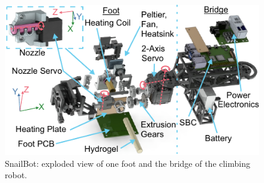 \begin{figure}
  \includegraphics[width=\linewidth]{chapters/papers/SB/figures/fig-7-snailbot-closeup-placeholder/fig-7-snailbot-closeup-placeholder.pdf}
  \caption{SnailBot: exploded view of one foot and the bridge of the climbing robot.}
  \label{fig:fig7-placeholder}
\end{figure}


